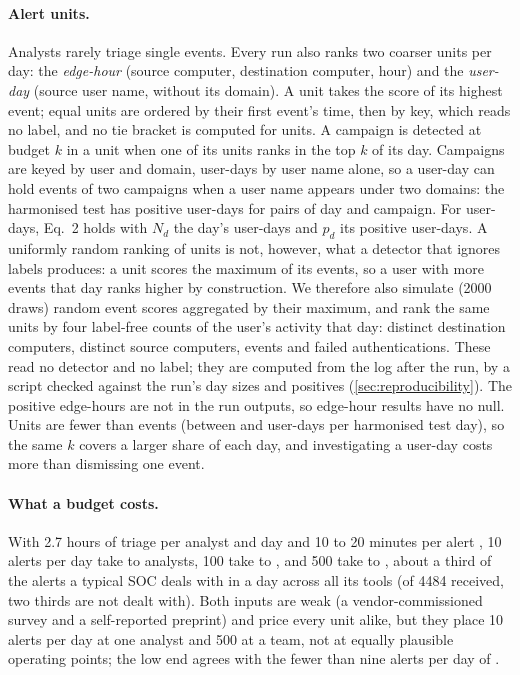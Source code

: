 \documentclass[11pt,a4paper]{article}
\begin{document}
\paragraph{Alert units.} Analysts rarely triage single events. Every run also ranks two coarser units per day: the \emph{edge-hour} (source computer, destination computer, hour) and the \emph{user-day} (source user name, without its domain). A unit takes the score of its highest event; equal units are ordered by their first event's time, then by key, which reads no label, and no tie bracket is computed for units. A campaign is detected at budget $k$ in a unit when one of its units ranks in the top $k$ of its day. Campaigns are keyed by user and domain, user-days by user name alone, so a user-day can hold events of two campaigns when a user name appears under two domains: the harmonised test has \HarmPositiveUserDays{} positive user-days for \HarmPositiveUserDayPairs{} pairs of day and campaign. For user-days, Eq.~2 holds with $N_d$ the day's user-days and $p_d$ its positive user-days. A uniformly random ranking of units is not, however, what a detector that ignores labels produces: a unit scores the maximum of its events, so a user with more events that day ranks higher by construction. We therefore also simulate (\num{2000} draws) random event scores aggregated by their maximum, and rank the same units by four label-free counts of the user's activity that day: distinct destination computers, distinct source computers, events and failed authentications. These read no detector and no label; they are computed from the log after the run, by a script checked against the run's day sizes and positives (\cref{sec:reproducibility}). The positive edge-hours are not in the run outputs, so edge-hour results have no null. Units are fewer than events (between \HarmUserDaysMin{} and \HarmUserDaysMax{} user-days per harmonised test day), so the same $k$ covers a larger share of each day, and investigating a user-day costs more than dismissing one event.

\paragraph{What a budget costs.} With 2.7 hours of triage per analyst and day \parencite{vectra2023} and 10 to 20 minutes per alert \parencite{li2026sheragent}, 10 alerts per day take \StaffTenLow{} to \StaffTenHigh{} analysts, 100 take \StaffHundredLow{} to \StaffHundredHigh{}, and 500 take \StaffFiveHundredLow{} to \StaffFiveHundredHigh{}, about a third of the alerts a typical SOC deals with in a day across all its tools (of \num{4484} received, two thirds are not dealt with). Both inputs are weak (a vendor-commissioned survey and a self-reported preprint) and price every unit alike, but they place 10 alerts per day at one analyst and 500 at a team, not at equally plausible operating points; the low end agrees with the fewer than nine alerts per day of \textcite{ho2021hopper}.
\end{document}
